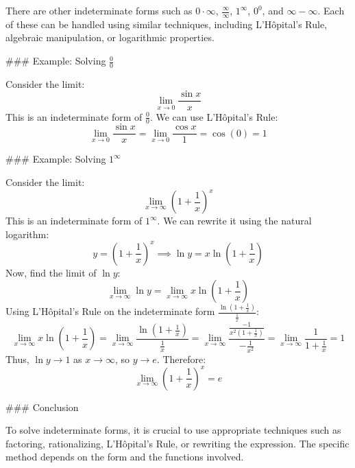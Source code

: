 \documentclass[14pt]{article}
\begin{document}
\begin{Large}
There are other indeterminate forms such as \(0 \cdot \infty\), \(\frac{\infty}{\infty}\), \(1^{\infty}\), \(0^0\), and \(\infty - \infty\). Each of these can be handled using similar techniques, including L'Hôpital's Rule, algebraic manipulation, or logarithmic properties.

### Example: Solving \(\frac{0}{0}\)

Consider the limit:
\[
\lim_{x \to 0} \frac{\sin x}{x}
\]
This is an indeterminate form of \(\frac{0}{0}\). We can use L'Hôpital's Rule:
\[
\lim_{x \to 0} \frac{\sin x}{x} = \lim_{x \to 0} \frac{\cos x}{1} = \cos(0) = 1
\]

### Example: Solving \(1^{\infty}\)

Consider the limit:
\[
\lim_{x \to \infty} \left(1 + \frac{1}{x}\right)^x
\]
This is an indeterminate form of \(1^{\infty}\). We can rewrite it using the natural logarithm:
\[
y = \left(1 + \frac{1}{x}\right)^x \implies \ln y = x \ln \left(1 + \frac{1}{x}\right)
\]
Now, find the limit of \(\ln y\):
\[
\lim_{x \to \infty} \ln y = \lim_{x \to \infty} x \ln \left(1 + \frac{1}{x}\right)
\]
Using L'Hôpital's Rule on the indeterminate form \(\frac{\ln \left(1 + \frac{1}{x}\right)}{\frac{1}{x}}\):
\[
\lim_{x \to \infty} x \ln \left(1 + \frac{1}{x}\right) = \lim_{x \to \infty} \frac{\ln \left(1 + \frac{1}{x}\right)}{\frac{1}{x}} = \lim_{x \to \infty} \frac{\frac{-1}{x^2(1 + \frac{1}{x})}}{-\frac{1}{x^2}} = \lim_{x \to \infty} \frac{1}{1 + \frac{1}{x}} = 1
\]
Thus, \(\ln y \to 1\) as \(x \to \infty\), so \(y \to e\). Therefore:
\[
\lim_{x \to \infty} \left(1 + \frac{1}{x}\right)^x = e
\]

### Conclusion

To solve indeterminate forms, it is crucial to use appropriate techniques such as factoring, rationalizing, L'Hôpital's Rule, or rewriting the expression. The specific method depends on the form and the functions involved.

\end{Large}
\end{document}
